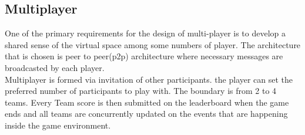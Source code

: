 \subsection*{Multiplayer}
One of the primary requirements for the design of multi-player is to develop a shared sense of the virtual space among some numbers of player. The architecture that is chosen is peer to peer(p2p) architecture where necessary messages are broadcasted by each player.\\
Multiplayer is formed via invitation of other participants. the player can set the preferred number of participants to play with. The boundary is from 2 to 4 teams. Every Team score is then submitted on the leaderboard when the game ends and all teams are concurrently updated on the events that are happening inside the game environment.
